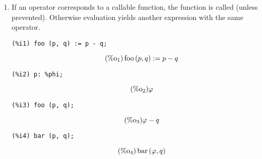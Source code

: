 \documentclass[12pt,leqno]{article}
\begin{document}
\begin{enumerate}
\item If an operator corresponds to a callable function,
the function is called (unless prevented).
Otherwise evaluation yields another expression with the same operator.
\begin{verbatim}
(%i1) foo (p, q) := p - q;
\end{verbatim}
\begin{equation}
\tag{$\mathop{\mathrm{\%o}}_{1}$}\mathop{\mathrm{foo}}\left(p, q\right) := p-q
\label{eq:doc-group1-code14-1-1}
\end{equation}
\begin{verbatim}
(%i2) p: %phi;
\end{verbatim}
\begin{equation}
\tag{$\mathop{\mathrm{\%o}}_{2}$}\varphi
\label{eq:doc-group1-code14-2-1}
\end{equation}
\begin{verbatim}
(%i3) foo (p, q);
\end{verbatim}
\begin{equation}
\tag{$\mathop{\mathrm{\%o}}_{3}$}\varphi-q
\label{eq:doc-group1-code14-3-1}
\end{equation}
\begin{verbatim}
(%i4) bar (p, q);
\end{verbatim}
\begin{equation}
\tag{$\mathop{\mathrm{\%o}}_{4}$}\mathop{\mathrm{bar}}\left(\varphi, q\right)
\label{eq:doc-group1-code14-4-1}
\end{equation}



\end{enumerate}
\end{document}
